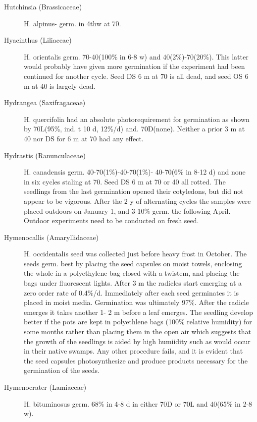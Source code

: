 \begin{description}
\item[Hutchinsia (Brassicaceae)] H. alpinus- germ. in 4thw at 70.
\item[Hyacinthus (Liliaceae)] H. orientalis germ. 70-40(100\% in 6-8 w) and
40(2\%)-70(20\%). This latter would probably have given more germination if the
experiment had been continued for another cycle. Seed DS 6 m at 70 is all dead, and
seed OS 6 m at 40 is largely dead.

\item[Hydrangea (Saxifragaceae)] H. quercifolia had an absolute
photo\-require\-ment for germination as shown by 70L(95\%, ind. t 10 d, 12\%/d) and.
70D(none). Neither a prior 3 m at 40 nor DS for 6 m at 70 had any effect.

\item[Hydrastis (Ranunculaceae)] H. canadensis germ. 40-70(1\%)-40-70(1\%)-
40-70(6\% in 8-12 d) and none in six cycles staling at 70. Seed DS 6 m at 70 or 40 all
rotted. The seedlings from the last germination opened their cotyledons, but did not
appear to be vigorous. After the 2 y of alternating cycles the samples were placed
outdoors on January 1, and 3-10\% germ. the following April. Outdoor experiments
need to be conducted on fresh seed.

\item[Hymenocallis (Amaryllidaceae)] H. occidentalis seed was collected just
before heavy frost in October. The seeds germ. best by placing the seed capsules on
moist towels, enclosing the whole in a polyethylene bag closed with a twistem, and
placing the bags under fluorescent lights. After 3 m the radicles start emerging at a
zero order rate of 0.4\%/d. Immediately after each seed germinates it is placed in moist
media. Germination was ultimately 97\%. After the radicle emerges it takes another 1-
2 m before a leaf emerges. The seedling develop better if the pots are kept in
polyethlene bags (100\% relative humidity) for some months rather than placing them
in the open air which suggests that the growth of the seedlings is aided by high
humiidity such as would occur in their native swamps. Any other procedure fails, and it
is evident that the seed capsules photosynthesize and produce products necessary for
the germination of the seeds.

\item[Hymenocrater (Lamiaceae)] H. bituminosus germ. 68\% in 4-8 d in either
70D or 70L and 40(65\% in 2-8 w).


\end{description}
